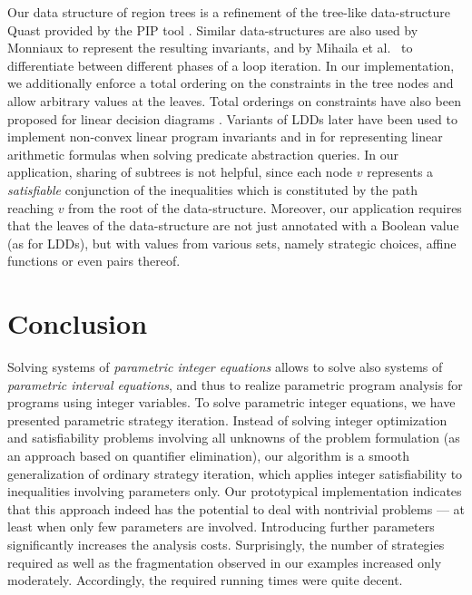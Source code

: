 \documentclass[a4paper]{easychair}
\begin{document}
Our data structure of region trees is a refinement of the tree-like data-structure {\sc Quast}
provided by the PIP tool \cite{pip}. Similar data-structures are also used by Monniaux \cite{monniaux09} to represent
the resulting invariants, and by Mihaila et al.\ \cite{mihaila13widening} to differentiate
between different phases of a loop iteration.
In our implementation, we additionally enforce a total ordering on the 
constraints in the tree nodes and allow arbitrary values at the leaves. 
Total orderings on constraints have also been proposed for linear decision diagrams \cite{DBLP:conf/fmcad/ChakiGS09}.
Variants of LDDs later have been used to implement non-convex linear program invariants 
\cite{Gurfinkel10,Ghorbal12} and in \cite{Gurfinkel11} for representing linear arithmetic formulas when
solving predicate abstraction queries.
In our application, sharing of subtrees is not helpful, since
each node $v$ represents a \emph{satisfiable} conjunction of the inequalities which is constituted by the path
reaching $v$ from the root of the data-structure.
Moreover, our application requires that the leaves of the data-structure are not just annotated with
a Boolean value (as for LDDs), but with values from various sets, namely strategic choices, affine functions 
or even pairs thereof.

\section{Conclusion} \label{s:conc}

Solving systems of \emph{parametric integer equations}
allows to solve also systems of \emph{parametric interval equations},
and thus to realize parametric program analysis
for programs using integer variables.
To solve parametric integer equations,
we have presented parametric strategy iteration. 
Instead of solving integer optimization and satisfiability problems
involving all unknowns of the problem formulation (as an approach
based on quantifier elimination),
our algorithm is a smooth generalization of ordinary
strategy iteration, which applies
integer satisfiability to inequalities involving 
parameters only.
Our prototypical implementation indicates that this
approach indeed has the potential to deal with nontrivial problems ---
at least when only few parameters are involved.
Introducing further parameters significantly increases the analysis costs.
Surprisingly, the number of strategies required 
as well as the fragmentation observed in our examples increased only moderately.
Accordingly, the required running times were quite decent.
\end{document}

